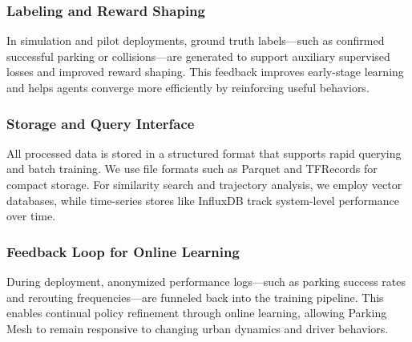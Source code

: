 \subsubsection{Labeling and Reward Shaping}
In simulation and pilot deployments, ground truth labels—such as confirmed successful parking or collisions—are generated to support auxiliary supervised losses and improved reward shaping. This feedback improves early-stage learning and helps agents converge more efficiently by reinforcing useful behaviors.

\subsubsection{Storage and Query Interface}
All processed data is stored in a structured format that supports rapid querying and batch training. We use file formats such as Parquet and TFRecords for compact storage. For similarity search and trajectory analysis, we employ vector databases, while time-series stores like InfluxDB track system-level performance over time.

\subsubsection{Feedback Loop for Online Learning}
During deployment, anonymized performance logs—such as parking success rates and rerouting frequencies—are funneled back into the training pipeline. This enables continual policy refinement through online learning, allowing Parking Mesh to remain responsive to changing urban dynamics and driver behaviors.

